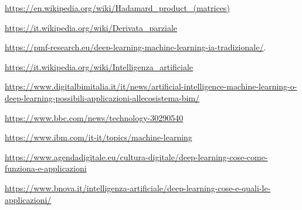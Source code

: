 
\renewcommand{\bibname}{Bibliografia}

    
    
    

\begin{thebibliography}{99}

\setlength{\itemsep}{0pt} %
\setlength{\parskip}{0pt} %
\raggedright %
\sloppy %


\url{https://en.wikipedia.org/wiki/Hadamard_product_(matrices)}

\url{https://it.wikipedia.org/wiki/Derivata_parziale}


\url{https://pmf-research.eu/deep-learning-machine-learning-ia-tradizionale/}.

\url{https://it.wikipedia.org/wiki/Intelligenza_artificiale}

\url{https://www.digitalbimitalia.it/it/news/artificial-intelligence-machine-learning-o-deep-learning-possibili-applicazioni-allecosistema-bim/}

\url{https://www.bbc.com/news/technology-30290540}

\url{https://www.ibm.com/it-it/topics/machine-learning}

\url{https://www.agendadigitale.eu/cultura-digitale/deep-learning-cose-come-funziona-e-applicazioni}

\url{https://www.bnova.it/intelligenza-artificiale/deep-learning-cose-e-quali-le-applicazioni/}


\end{thebibliography}
